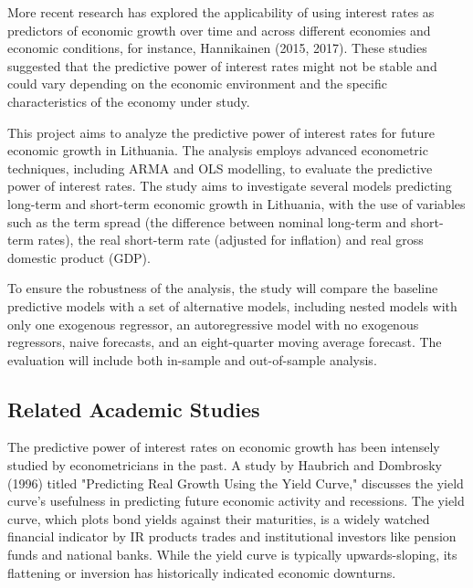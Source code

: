 \documentclass[12pt]{article}
\begin{document}
More recent research has explored the applicability of using interest rates as predictors of economic growth over time and across different economies and economic conditions, for instance, Hannikainen (2015, 2017). These studies suggested that the predictive power of interest rates might not be stable and could vary depending on the economic environment and the specific characteristics of the economy under study.

This project aims to analyze the predictive power of interest rates for future economic growth in Lithuania. The analysis employs advanced econometric techniques, including ARMA and OLS modelling, to evaluate the predictive power of interest rates. The study aims to investigate several models predicting long-term and short-term economic growth in Lithuania, with the use of variables such as the term spread (the difference between nominal long-term and short-term rates), the real short-term rate (adjusted for inflation) and real gross domestic product (GDP).

To ensure the robustness of the analysis, the study will compare the baseline predictive models with a set of alternative models, including nested models with only one exogenous regressor, an autoregressive model with no exogenous regressors, naive forecasts, and an eight-quarter moving average forecast. The evaluation will include both in-sample and out-of-sample analysis.


\subsection{Related Academic Studies}

The predictive power of interest rates on economic growth has been intensely studied by econometricians in the past. A study by Haubrich and Dombrosky (1996) titled "Predicting Real Growth Using the Yield Curve," discusses the yield curve's usefulness in predicting future economic activity and recessions. The yield curve, which plots bond yields against their maturities, is a widely watched financial indicator by IR products trades and institutional investors like pension funds and national banks. While the yield curve is typically upwards-sloping, its flattening or inversion has historically indicated economic downturns.
\end{document}
